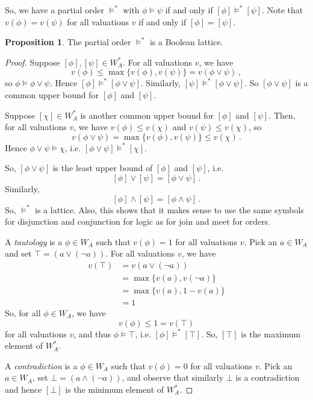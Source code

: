 \documentclass[12pt]{article}
\theoremstyle{definition}
\newtheorem*{proposition}{\color{blue} Proposition}
\begin{document}
\begin{multicols*}{2}
So, we have a partial order $\vDash^\ast$ with $\phi\vDash\psi$ if and only if $[\phi]\vDash^\ast[\psi]$. Note that $v(\phi) = v(\psi)$ for all valuations $v$ if and only if $[\phi] = [\psi]$.

\begin{proposition}
	The partial order $\vDash^\ast$ is a Boolean lattice.
\end{proposition}
\begin{proof}
	Suppose $[\phi],[\psi]\in W_A^\ast$. For all valuations $v$, we have
	\[
		v(\phi)\leq\max\{v(\phi), v(\psi)\} = v(\phi\lor\psi)\,,
	\]
	so $\phi\vDash \phi\lor\psi$. Hence $[\phi]\vDash^\ast[\phi\lor\psi]$. Similarly, $[\psi]\vDash^\ast[\phi\lor\psi]$. So $[\phi\lor\psi]$ is a common upper bound for $[\phi]$ and $[\psi]$.
	
	Suppose $[\chi]\in W_A^\ast$ is another common upper bound for $[\phi]$ and $[\psi]$. Then, for all valuations $v$, we have $v(\phi)\leq v(\chi)$ and $v(\psi)\leq v(\chi)$, so
	\[
		v(\phi\lor\psi) = \max\{v(\phi), v(\psi)\} \leq v(\chi)\,.
	\]
	Hence $\phi\lor\psi\vDash \chi$, i.e. $[\phi\lor\psi] \vDash^\ast [\chi]$.
	
	So, $[\phi\lor\psi]$ is the least upper bound of $[\phi]$ and $[\psi]$, i.e. \[[\phi]\lor[\psi] = [\phi\lor\psi]\,.\] Similarly, \[[\phi]\land[\psi] = [\phi\land\psi]\,.\] So, $\vDash^\ast$ is a lattice. Also, this shows that it makes sense to use the same symbols for disjunction and conjunction for logic as for join and meet for orders.
	
	A \emph{tautology} is a $\phi\in W_A$ such that $v(\phi)=1$ for all valuations $v$. Pick an $a\in W_A$ and set $\top = (a\lor(\neg a))$. For all valuations $v$, we have
	\begin{align*}
		v(\top) &= v(a\lor(\neg a)) \\
		&= \max\{v(a), v(\neg a)\} \\
		&= \max\{v(a), 1 - v(a)\} \\
		&= 1
	\end{align*}
	So, for all $\phi\in W_A$, we have
	\[
		v(\phi) \leq 1 = v(\top)
	\]
	for all valuations $v$, and thus $\phi\vDash\top$, i.e. $[\phi]\vDash^\ast[\top]$. So, $[\top]$ is the maximum element of $W_A^\ast$.
	
	A \emph{contradiction} is a $\phi\in W_A$ such that $v(\phi)=0$ for all valuations $v$. Pick an $a\in W_A$, set $\bot = (a\land(\neg a))$, and observe that similarly $\bot$ is a contradiction and hence $[\bot]$ is the minimum element of $W_A^\ast$.
	

\end{proof}
\end{multicols*}
\end{document}
